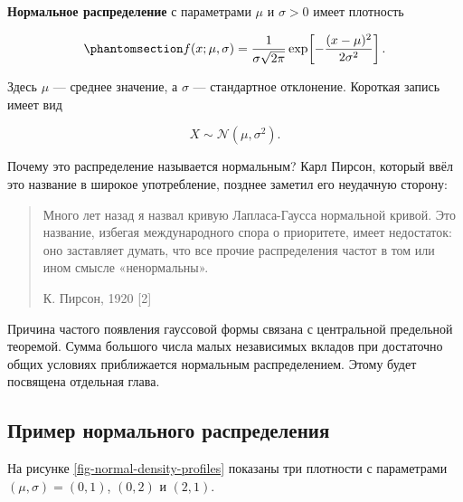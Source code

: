 \documentclass[
  russian,
  11pt,
  a4paper,
  open=any]{scrbook}
\begin{document}
\begin{booknote}

\textbf{Нормальное распределение} с параметрами \(\mu\) и \(\sigma>0\)
имеет плотность

\begin{equation}\protect\phantomsection\label{eq-normal-density}{
f(x;\mu,\sigma)
=\frac{1}{\sigma\sqrt{2\pi}}
\exp\!\left[-\frac{(x-\mu)^2}{2\sigma^2}\right].
}\end{equation}

Здесь \(\mu\) --- среднее значение, а \(\sigma\) --- стандартное
отклонение. Короткая запись имеет вид

\[
X\sim\mathcal N(\mu,\sigma^2).
\]

\end{booknote}

Почему это распределение называется нормальным? Карл Пирсон, который
ввёл это название в широкое употребление, позднее заметил его неудачную
сторону:

\begin{quote}
Много лет назад я назвал кривую Лапласа-Гаусса нормальной кривой. Это
название, избегая международного спора о приоритете, имеет недостаток:
оно заставляет думать, что все прочие распределения частот в том или
ином смысле «ненормальны».

К. Пирсон, 1920 {[}2{]}
\end{quote}

Причина частого появления гауссовой формы связана с центральной
предельной теоремой. Сумма большого числа малых независимых вкладов при
достаточно общих условиях приближается нормальным распределением. Этому
будет посвящена отдельная глава.

\subsection{Пример нормального
распределения}\label{ux43fux440ux438ux43cux435ux440-ux43dux43eux440ux43cux430ux43bux44cux43dux43eux433ux43e-ux440ux430ux441ux43fux440ux435ux434ux435ux43bux435ux43dux438ux44f}

На рисунке \ref{fig-normal-density-profiles} показаны три плотности с
параметрами \((\mu,\sigma)=(0,1)\), \((0,2)\) и \((2,1)\).
\end{document}
